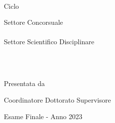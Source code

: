 \begin{titlepage}
\begin{addmargin}[-1cm]{-3cm}
\begin{center}

\begingroup
\large
\myUniversity \\
\bigskip
{} \\ 
\spacedallcaps{\myFaculty} \\
\bigskip
Ciclo \myCycle
\vfill

Settore Concorsuale \\
\spacedlowsmallcaps{\mySector} \\
\medskip
Settore Scientifico Disciplinare \\
\spacedlowsmallcaps{\myScientificSector} \\
\vfill

\begingroup
\color{Maroon}
\spacedallcaps{\myTitle} \\ %
\bigskip
\endgroup

Presentata da \\ \spacedlowsmallcaps{\myName} %
\vfill


Coordinatore Dottorato \hfill Supervisore \\
\spacedlowsmallcaps{\myCoordinator} \hfill \spacedlowsmallcaps{\mySupervisor}
\vfill

Esame Finale - Anno 2023
\endgroup
\end{center}
\end{addmargin}
\end{titlepage}